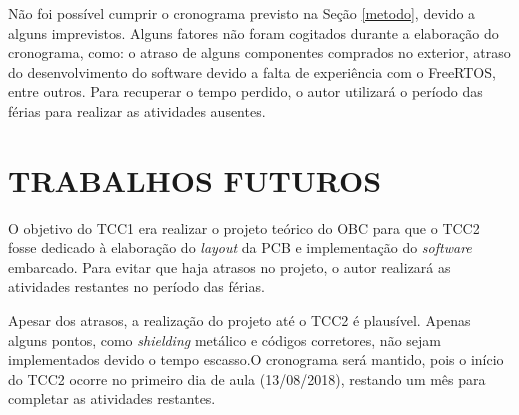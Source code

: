 Não foi possível cumprir o cronograma previsto na Seção \ref{metodo}, devido a alguns imprevistos. Alguns fatores não foram cogitados durante a elaboração do cronograma, como: o atraso de alguns componentes comprados no exterior, atraso do desenvolvimento do software devido a falta de experiência com o FreeRTOS, entre outros. Para recuperar o tempo perdido, o autor utilizará o período das férias para realizar as atividades ausentes. 


\chapter[TRABALHOS FUTUROS]{TRABALHOS FUTUROS}

O objetivo do TCC1 era realizar o projeto teórico do OBC para que o TCC2 fosse dedicado à elaboração do \textit{layout} da PCB e implementação do \textit{software} embarcado. Para evitar que haja atrasos no projeto, o autor realizará as atividades restantes no período das férias.

Apesar dos atrasos, a realização do projeto até o TCC2 é plausível. Apenas alguns pontos, como \textit{shielding} metálico e códigos corretores, não sejam implementados devido o tempo escasso.O cronograma será mantido, pois o início do TCC2 ocorre no primeiro dia de aula (13/08/2018), restando um mês para completar as atividades restantes.




